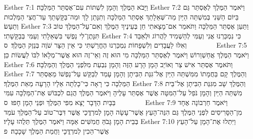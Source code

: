 Esther 7:1	וַיָּבֹא הַמֶּלֶךְ וְהָמָן לִשְׁתּוֹת עִם־אֶסְתֵּר הַמַּלְכָּה׃
Esther 7:2	וַיֹּאמֶר הַמֶּלֶךְ לְאֶסְתֵּר גַּם בַּיּוֹם הַשֵּׁנִי בְּמִשְׁתֵּה הַיַּיִן מַה־שְּׁאֵלָתֵךְ אֶסְתֵּר הַמַּלְכָּה וְתִנָּתֵן לָךְ וּמַה־בַּקָּשָׁתֵךְ עַד־חֲצִי הַמַּלְכוּת וְתֵעָשׂ׃
Esther 7:3	וַתַּעַן אֶסְתֵּר הַמַּלְכָּה וַתֹּאמַר אִם־מָצָאתִי חֵן בְּעֵינֶיךָ הַמֶּלֶךְ וְאִם־עַל־הַמֶּלֶךְ טוֹב תִּנָּתֶן־לִי נַפְשִׁי בִּשְׁאֵלָתִי וְעַמִּי בְּבַקָּשָׁתִי׃
Esther 7:4	כִּי נִמְכַּרְנוּ אֲנִי וְעַמִּי לְהַשְׁמִיד לַהֲרוֹג וּלְאַבֵּד וְאִלּוּ לַעֲבָדִים וְלִשְׁפָחוֹת נִמְכַּרְנוּ הֶחֱרַשְׁתִּי כִּי אֵין הַצָּר שֹׁוֶה בְּנֵזֶק הַמֶּלֶךְ׃ {ס}        
Esther 7:5	וַיֹּאמֶר הַמֶּלֶךְ אֲחַשְׁוֵרוֹשׁ וַיֹּאמֶר לְאֶסְתֵּר הַמַּלְכָּה מִי הוּא זֶה וְאֵי־זֶה הוּא אֲשֶׁר־מְלָאוֹ לִבּוֹ לַעֲשׂוֹת כֵּן׃
Esther 7:6	וַתֹּאמֶר אֶסְתֵּר אִישׁ צַר וְאוֹיֵב הָמָן הָרָע הַזֶּה וְהָמָן נִבְעַת מִלִּפְנֵי הַמֶּלֶךְ וְהַמַּלְכָּה׃
Esther 7:7	וְהַמֶּלֶךְ קָם בַּחֲמָתוֹ מִמִּשְׁתֵּה הַיַּיִן אֶל־גִּנַּת הַבִּיתָן וְהָמָן עָמַד לְבַקֵּשׁ עַל־נַפְשׁוֹ מֵאֶסְתֵּר הַמַּלְכָּה כִּי רָאָה כִּי־כָלְתָה אֵלָיו הָרָעָה מֵאֵת הַמֶּלֶךְ׃
Esther 7:8	וְהַמֶּלֶךְ שָׁב מִגִּנַּת הַבִּיתָן אֶל־בֵּית  מִשְׁתֵּה הַיַּיִן וְהָמָן נֹפֵל עַל־הַמִּטָּה אֲשֶׁר אֶסְתֵּר עָלֶיהָ וַיֹּאמֶר הַמֶּלֶךְ הֲגַם לִכְבּוֹשׁ אֶת־הַמַּלְכָּה עִמִּי בַּבָּיִת הַדָּבָר יָצָא מִפִּי הַמֶּלֶךְ וּפְנֵי הָמָן חָפוּ׃ {ס}        
Esther 7:9	וַיֹּאמֶר חַרְבוֹנָה אֶחָד מִן־הַסָּרִיסִים לִפְנֵי הַמֶּלֶךְ גַּם הִנֵּה־הָעֵץ אֲשֶׁר־עָשָׂה הָמָן לְמרְדֳּכַי אֲשֶׁר דִּבֶּר־טוֹב עַל־הַמֶּלֶךְ עֹמֵד בְּבֵית הָמָן גָּבֹהַּ חֲמִשִּׁים אַמָּה וַיֹּאמֶר הַמֶּלֶךְ תְּלֻהוּ עָלָיו׃
Esther 7:10	וַיִּתְלוּ אֶת־הָמָן עַל־הָעֵץ אֲשֶׁר־הֵכִין לְמרְדֳּכָי וַחֲמַת הַמֶּלֶךְ שָׁכָכָה׃ {פ}
